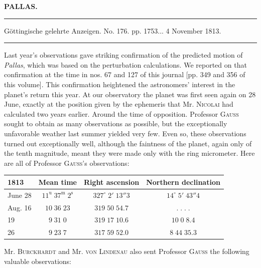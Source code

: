 \clearpage{}\hypertarget{native-374-lower}{}\label{native-374-lower}
\begin{center}\textbf{PALLAS.}\par\vspace{4pt}\hrule\vspace{4pt}\fontsize{10}{12}\selectfont Göttingische gelehrte Anzeigen. No. 176. pp. 1753\;... 4 November 1813.\par\vspace{4pt}\hrule\vspace{4pt}\end{center}

\par\indent Last year’s observations gave striking confirmation of the predicted motion of \emph{Pallas}, which was based on the perturbation calculations. We reported on that confirmation at the time in nos. 67 and 127 of this journal [pp. 349 and 356 of this volume]. This confirmation heightened the astronomers’ interest in the planet’s return this year. At our observatory the planet was first seen again on 28 June, exactly at the position given by the ephemeris that Mr. \textsc{Nicolai} had calculated two years earlier. Around the time of opposition. Professor \textsc{Gauss} sought to obtain as many observations as possible, but the exceptionally unfavorable weather last summer yielded very few. Even so, these observations turned out exceptionally well, although the faintness of the planet, again only of the tenth magnitude, meant they were made only with the ring micrometer. Here are all of Professor \textsc{Gauss}’s observations:

\begin{center}\fontsize{10}{12}\selectfont\setlength{\tabcolsep}{5pt}\renewcommand{\arraystretch}{1.15}\begin{tabular}{l|c|c|c}
1813 & Mean time & Right ascension & Northern declination\\\hline
June 28 & $11^{\mathrm u}\;37^{\mathrm m}\;2^{\mathrm s}$ & $327^\circ\;2'\;13''3$ & $14^\circ\;5'\;43''4$\\
Aug. 16 & $10\;36\;23$ & $319\;50\;54.7$ & $.\;.\;.\;.$\\
19 & $9\;31\;0$ & $319\;17\;10.6$ & $10\;0\;8.4$\\
26 & $9\;23\;7$ & $317\;59\;52.0$ & $8\;44\;35.3$\\
\end{tabular}\end{center}

\par\indent Mr. \textsc{Burckhardt} and Mr. \textsc{von Lindenau} also sent Professor \textsc{Gauss} the following valuable observations:

